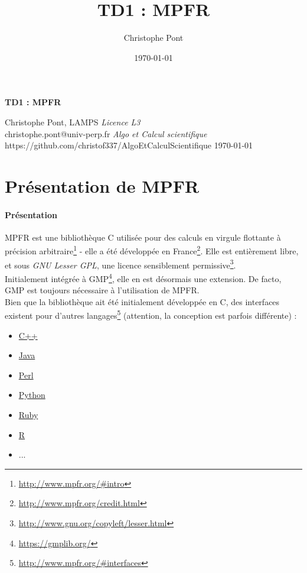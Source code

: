 \documentclass[a4paper,11pt]{exam}
\begin{document}
\title{\large TD1 : MPFR}
\author{Christophe Pont}
\date{\today{}} %

\lstset{
	language=C, 
	breakatwhitespace=false,
	breaklines=true, 
	showspaces=false
	showstringspaces=false,          %
  	showtabs=false                  %
} 

\centering
{\huge\bfseries TD1 : MPFR\par}
\begin{flushleft}
{Christophe Pont, LAMPS \hfill \emph{Licence L3}\\ 
christophe.pont@univ-perp.fr \hfill \emph{Algo et Calcul scientifique} \\ 
https://github.com/christof337/AlgoEtCalculScientifique \hfill \today} \\ 
\end{flushleft}

\justifying
\section{Présentation de MPFR}
\paragraph{Présentation}
MPFR est une bibliothèque C utilisée pour des calculs en virgule flottante à précision arbitraire\footnote{\url{http://www.mpfr.org/\#intro}} - elle a été développée en France\footnote{\url{http://www.mpfr.org/credit.html}}. 
Elle est entièrement libre, et sous \emph{GNU Lesser GPL}, une licence sensiblement permissive\footnote{\url{http://www.gnu.org/copyleft/lesser.html}}.\\
Initialement intégrée à GMP\footnote{\url{https://gmplib.org/}}, elle en est désormais une extension. De facto, GMP est toujours nécessaire à l'utilisation de MPFR. \\
Bien que la bibliothèque ait été initialement développée en C, des interfaces existent pour d'autres langages\footnote{\url{http://www.mpfr.org/\#interfaces}} (attention, la conception est parfois différente) :
	\begin{itemize}
		\item \href{http://www.mpfr.org/\#interfaces}{C++}
		\item \href{https://github.com/kframework/mpfr-java}{Java}
		\item \href{http://search.cpan.org/~sisyphus/Math-MPFR/}{Perl}
		\item \href{https://pypi.python.org/pypi/gmpy2}{Python}
		\item \href{http://rubygems.org/gems/gmp}{Ruby}
		\item \href{https://cran.r-project.org/web/packages/Rmpfr/index.html}{R}
		\item ...
	\end{itemize}
\end{document}
